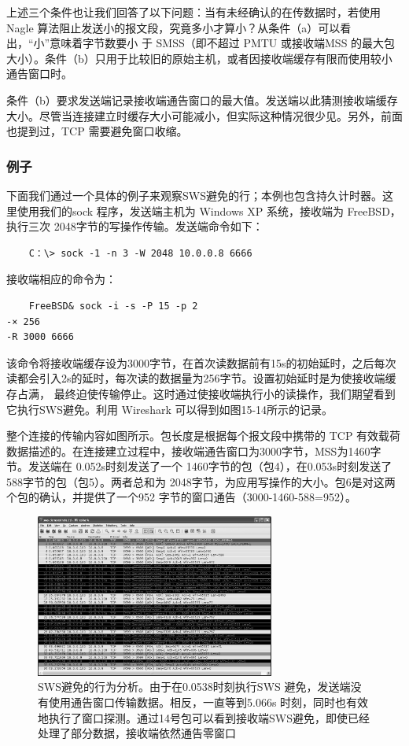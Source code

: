 上述三个条件也让我们回答了以下问题：当有未经确认的在传数据时，若使用Nagle 算法阻止发送小的报文段，究竟多小才算小？从条件（a）可以看出，“小”意味着字节数要小
于 SMSS（即不超过 PMTU 或接收端MSS 的最大包大小）。条件（b）只用于比较旧的原始主机，或者因接收端缓存有限而使用较小通告窗口时。

条件（b）要求发送端记录接收端通告窗口的最大值。发送端以此猜测接收端缓存大小。尽管当连接建立时缓存大小可能减小，但实际这种情况很少见。另外，前面也提到过，TCP
需要避免窗口收缩。

\subsubsection{例子}
下面我们通过一个具体的例子来观察SWS避免的行；本例也包含持久计时器。这里使用我们的sock 程序，发送端主机为 Windows XP 系统，接收端为 FreeBSD，执行三次
2048字节的写操作传输。发送端命令如下：
\begin{verbatim}
    C：\> sock -1 -n 3 -W 2048 10.0.0.8 6666
\end{verbatim}
接收端相应的命令为：
\begin{verbatim}
    FreeBSD& sock -i -s -P 15 -p 2
-× 256
-R 3000 6666
\end{verbatim}

该命令将接收端缓存设为3000字节，在首次读数据前有15s的初始延时，之后每次读都会引入2s的延时，每次读的数据量为256字节。设置初始延时是为使接收端缓存占满，
最终迫使传输停止。这时通过使接收端执行小的读操作，我们期望看到它执行SWS避免。利用 Wireshark 可以得到如图15-14所示的记录。

整个连接的传输内容如图所示。包长度是根据每个报文段中携带的 TCP 有效载荷数据描述的。在连接建立过程中，接收端通告窗口为3000字节，MSS为1460字节。发送端在
0.052s时刻发送了一个 1460字节的包（包4），在0.053s时刻发送了588字节的包（包5）。两者总和为 2048字节，为应用写操作的大小。包6是对这两个包的确认，并提供了一个952
字节的窗口通告（3000-1460-588=952）。
\begin{figure}[!htb]
    \centering
	\includegraphics[width=0.7\textwidth]{imgs/15/15-14.png}
	\caption{SWS避免的行为分析。由于在0.0538时刻执行SWS 避免，发送端没有使用通告窗口传输数据。相反，一直等到5.066s 时刻，同时也有效地执行了窗口探测。通过14号包可以看到接收端SWS避免，即使已经处理了部分数据，接收端依然通告零窗口}
\end{figure}

